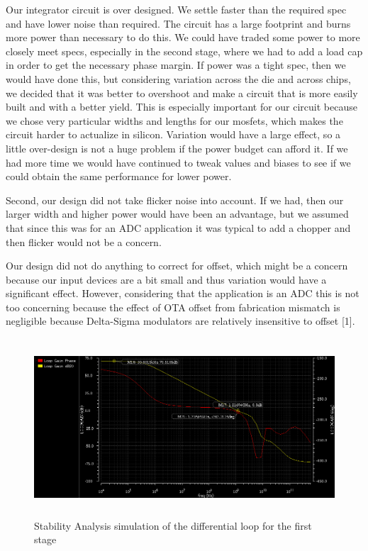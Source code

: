 \documentclass[conference]{IEEEtran}
\begin{document}
Our integrator circuit is over designed. We settle faster than the required spec and have lower noise than required. The circuit has a large footprint and burns more power than necessary to do this. We could have traded some power to more closely meet specs, especially in the second stage, where we had to add a load cap in order to get the necessary phase margin. If power was a tight spec, then we would have done this, but considering variation across the die and across chips, we decided that it was better to overshoot and make a circuit that is more easily built and with a better yield. This is especially important for our circuit because we chose very particular widths and lengths for our mosfets, which makes the circuit harder to actualize in silicon. Variation would have a large effect, so a little over-design is not a huge problem if the power budget can afford it. If we had more time we would have continued to tweak values and biases to see if we could obtain the same performance for lower power.

Second, our design did not take flicker noise into account. If we had, then our larger width and higher power would have been an advantage, but we assumed that since this was for an ADC application it was typical to add a chopper and then flicker would not be a concern.

Our design did not do anything to correct for offset, which might be a concern because our input devices are a bit small and thus variation would have a significant effect. However, considering that the application is an ADC this is not too concerning because the effect of OTA offset from fabrication mismatch is negligible because Delta-Sigma modulators are relatively insensitive to offset [1].





\begin{figure}[H]
\centering
\includegraphics[height=250px]{piktures/st1_diff_ac}
\caption{Stability Analysis simulation of the differential loop for the first stage}
\label{fig:st1_diff_ac}
\end{figure}
\end{document}
